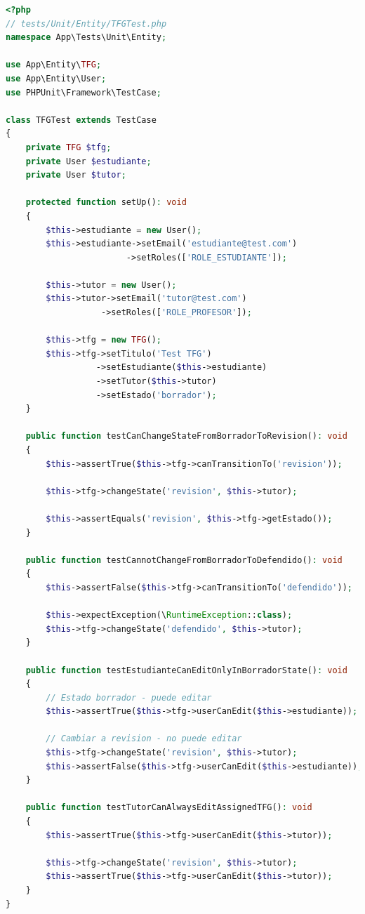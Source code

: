 \documentclass[12pt,a4paper,oneside]{report}
\begin{document}
\begin{lstlisting}[language=PHP]
<?php
// tests/Unit/Entity/TFGTest.php
namespace App\Tests\Unit\Entity;

use App\Entity\TFG;
use App\Entity\User;
use PHPUnit\Framework\TestCase;

class TFGTest extends TestCase
{
    private TFG $tfg;
    private User $estudiante;
    private User $tutor;

    protected function setUp(): void
    {
        $this->estudiante = new User();
        $this->estudiante->setEmail('estudiante@test.com')
                        ->setRoles(['ROLE_ESTUDIANTE']);

        $this->tutor = new User();
        $this->tutor->setEmail('tutor@test.com')
                   ->setRoles(['ROLE_PROFESOR']);

        $this->tfg = new TFG();
        $this->tfg->setTitulo('Test TFG')
                  ->setEstudiante($this->estudiante)
                  ->setTutor($this->tutor)
                  ->setEstado('borrador');
    }

    public function testCanChangeStateFromBorradorToRevision(): void
    {
        $this->assertTrue($this->tfg->canTransitionTo('revision'));
        
        $this->tfg->changeState('revision', $this->tutor);
        
        $this->assertEquals('revision', $this->tfg->getEstado());
    }

    public function testCannotChangeFromBorradorToDefendido(): void
    {
        $this->assertFalse($this->tfg->canTransitionTo('defendido'));
        
        $this->expectException(\RuntimeException::class);
        $this->tfg->changeState('defendido', $this->tutor);
    }

    public function testEstudianteCanEditOnlyInBorradorState(): void
    {
        // Estado borrador - puede editar
        $this->assertTrue($this->tfg->userCanEdit($this->estudiante));
        
        // Cambiar a revision - no puede editar
        $this->tfg->changeState('revision', $this->tutor);
        $this->assertFalse($this->tfg->userCanEdit($this->estudiante));
    }

    public function testTutorCanAlwaysEditAssignedTFG(): void
    {
        $this->assertTrue($this->tfg->userCanEdit($this->tutor));
        
        $this->tfg->changeState('revision', $this->tutor);
        $this->assertTrue($this->tfg->userCanEdit($this->tutor));
    }
}
\end{lstlisting}
\end{document}
